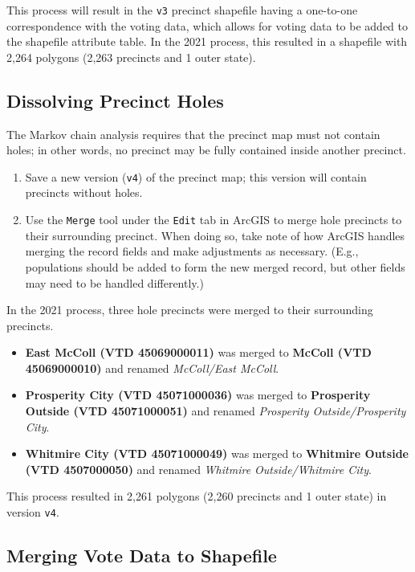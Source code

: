 \documentclass[11pt]{article}
\begin{document}
This process will result in the \verb|v3| precinct shapefile having a one-to-one correspondence with the voting data, which allows for voting data to be added to the shapefile attribute table. In the 2021 process, this resulted in a shapefile with 2,264 polygons (2,263 precincts and 1 outer state).

\subsection{Dissolving Precinct Holes}

The Markov chain analysis requires that the precinct map must not contain holes; in other words, no precinct may be fully contained inside another precinct.

\begin{enumerate}
	\item Save a new version (\verb|v4|) of the precinct map; this version will contain precincts without holes.
	\item Use the \verb|Merge| tool under the \verb|Edit| tab in ArcGIS to merge hole precincts to their surrounding precinct. When doing so, take note of how ArcGIS handles merging the record fields and make adjustments as necessary. (E.g., populations should be added to form the new merged record, but other fields may need to be handled differently.)
\end{enumerate}

In the 2021 process, three hole precincts were merged to their surrounding precincts.

\begin{itemize}
	\item \textbf{East McColl (VTD 45069000011)} was merged to \textbf{McColl (VTD 45069000010)} and renamed \textit{McColl/East McColl}.
	\item \textbf{Prosperity City (VTD 45071000036)} was merged to \textbf{Prosperity Outside (VTD 45071000051)} and renamed \textit{Prosperity Outside/Prosperity City}.
	\item \textbf{Whitmire City (VTD 45071000049)} was merged to \textbf{Whitmire Outside (VTD 4507000050)} and renamed \textit{Whitmire Outside/Whitmire City}.
	
\end{itemize}

This process resulted in 2,261 polygons (2,260 precincts and 1 outer state) in version \verb|v4|.

\subsection{Merging Vote Data to Shapefile}
\end{document}
